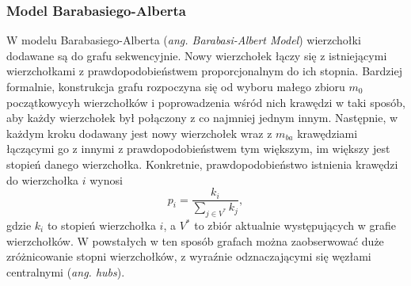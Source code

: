     \subsubsection{Model Barabasiego-Alberta}
    W modelu Barabasiego-Alberta (\emph{ang. Barabasi-Albert Model}) wierzchołki dodawane są do grafu sekwencyjnie. Nowy wierzchołek łączy się z istniejącymi wierzchołkami z prawdopodobieństwem proporcjonalnym do ich stopnia. Bardziej formalnie, konstrukcja grafu rozpoczyna się od wyboru małego zbioru $m_0$ początkowycyh wierzchołków i poprowadzenia wśród nich krawędzi w taki sposób, aby każdy wierzchołek był połączony z co najmniej jednym innym. Następnie, w każdym kroku dodawany jest nowy wierzchołek wraz z $m_{ba}$ krawędziami łączącymi go z innymi z prawdopodobieństwem tym większym, im większy jest stopień danego wierzchołka. Konkretnie, prawdopodobieństwo istnienia krawędzi do wierzchołka $i$ wynosi 
    \[
        p_i = \frac{k_i}{\sum_{j \in V^{*}} k_j},
    \]
    gdzie $k_i$ to stopień wierzchołka $i$, a $V^{*}$ to zbiór aktualnie występujących w grafie wierzchołków. W powstałych w ten sposób grafach można zaobserwować duże zróżnicowanie stopni wierzchołków, z wyraźnie odznaczającymi się węzłami centralnymi (\emph{ang. hubs}).

